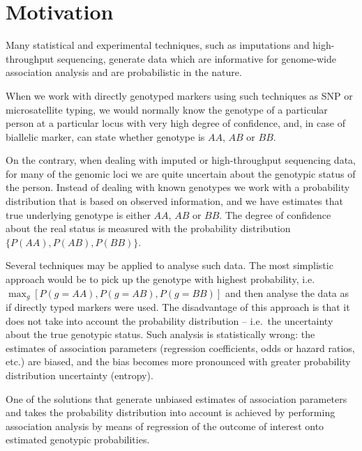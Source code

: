 \documentclass[12pt,a4paper]{article}
\begin{document}
\maketitle
\tableofcontents


\section{Motivation}

Many statistical and experimental techniques, such as imputations and 
high-throughput sequencing, generate data which are informative for 
genome-wide association analysis and are probabilistic in the nature. 

When we work with directly genotyped markers using such techniques as 
SNP or microsatellite typing, we would normally know the genotype of 
a particular person at a particular locus with very high degree of 
confidence, and, in case of biallelic marker, can state whether 
genotype is $AA$, $AB$ or $BB$. 

On the contrary, when dealing with imputed or 
high-throughput sequencing data, for many of the genomic loci 
we are quite uncertain about the genotypic status of the person.
Instead of dealing with known genotypes we work with a probability
distribution that is based on observed information, and we have estimates that true underlying 
genotype is either $AA$, $AB$ or $BB$. The degree of confidence 
about the real status is measured with the 
probability distribution $\{P(AA), P(AB), P(BB)\}$.

Several techniques may be applied to analyse such data. The most 
simplistic approach would be to pick up the genotype with highest 
probability, i.e.~$\max_g[P(g=AA), P(g=AB), P(g=BB)]$ and then 
analyse the data as if directly typed markers were used. The 
disadvantage of this approach is that it does not take into 
account the probability distribution -- i.e.~the uncertainty 
about the true genotypic status. Such 
analysis is statistically wrong: the estimates of association 
parameters (regression coefficients, odds or hazard ratios, etc.) 
are biased, and the bias becomes more pronounced with greater 
probability distribution uncertainty (entropy). 

One of the solutions that generate unbiased estimates 
of association parameters and takes the
probability distribution into account is achieved by 
performing association analysis by means of regression of the 
outcome of interest onto estimated genotypic probabilities. 
\end{document}
